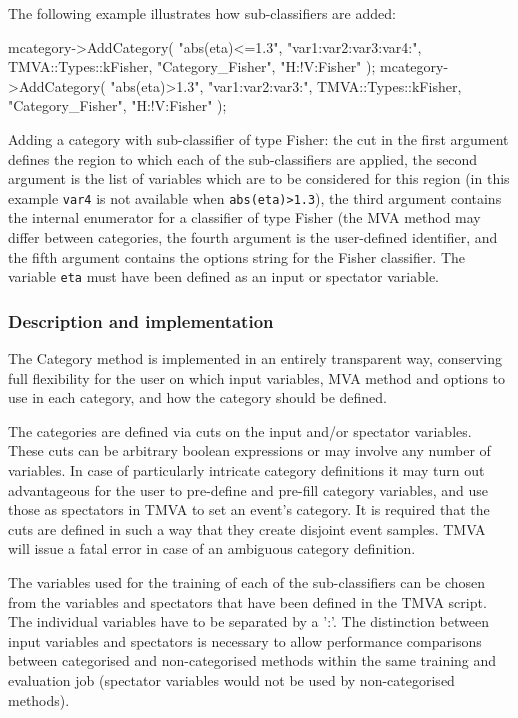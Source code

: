 The following example illustrates how sub-classifiers are added:
\begin{codeexample}
\begin{tmvacode}
mcategory->AddCategory( "abs(eta)<=1.3",
		      "var1:var2:var3:var4:", 
		      TMVA::Types::kFisher,
		      "Category_Fisher",
		      "H:!V:Fisher" );
mcategory->AddCategory( "abs(eta)>1.3",
		      "var1:var2:var3:", 
		      TMVA::Types::kFisher,
		      "Category_Fisher",
		      "H:!V:Fisher" );
\end{tmvacode}
\caption[.]{\codeexampleCaptionSize Adding a category with sub-classifier of type Fisher: 
           the cut in the first argument defines the region to which each of the 
           sub-classifiers are applied, the second argument is the list of variables 
           which are to be considered for this region (in this example {\tt var4} is  
           not available when {\tt abs(eta)>1.3}), the third argument contains
           the internal enumerator for a classifier of type Fisher (the MVA method may
           differ between categories, the fourth
           argument is the user-defined identifier, and the fifth argument 
           contains the options string for the Fisher classifier. The variable {\tt eta}
           must have been defined as an input or spectator variable. }
\end{codeexample}			

\subsubsection{Description and implementation}
\label{sec:category:impl}

The Category method is implemented in an entirely transparent way, conserving full
flexibility for the user on which input variables, MVA method and options to use in 
each category, and how the category should be defined. 

The categories are defined via cuts on the input and/or spectator variables. These 
cuts can be arbitrary boolean expressions or may involve any number of variables. 
In case of particularly intricate category definitions it may turn out advantageous 
for the user to pre-define and pre-fill category variables, and use those as spectators 
in TMVA to set an event's category. It is required that the cuts are defined in such 
a way that they create disjoint event samples. TMVA will issue a fatal error in case 
of an ambiguous category definition. 

The variables used for the training of each of the sub-classifiers can be chosen from 
the variables and spectators that have been defined in the TMVA script. The 
individual variables have to be separated by a ':'. The distinction between input 
variables and spectators is necessary to allow performance comparisons
between categorised and non-categorised methods within the same training and evaluation 
job (spectator variables would not be used by non-categorised methods). 


